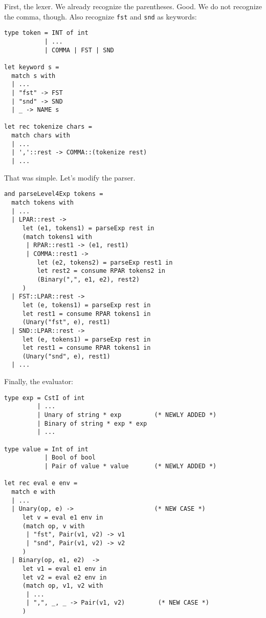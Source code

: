 \documentclass[addpoints]{exam}
\begin{document}
\begin{questions}
  \begin{solution}
    First, the lexer.
    We already recognize the parentheses. Good.
    We do not recognize the comma, though.
    Also recognize \texttt{fst} and \texttt{snd} as keywords:

    \begin{verbatim}
type token = INT of int
           | ...
           | COMMA | FST | SND

let keyword s =
  match s with
  | ...
  | "fst" -> FST
  | "snd" -> SND
  | _ -> NAME s
  
let rec tokenize chars =
  match chars with
  | ...
  | ','::rest -> COMMA::(tokenize rest)
  | ...
    \end{verbatim}

    That was simple.
    Let's modify the parser.

    \begin{verbatim}
and parseLevel4Exp tokens =
  match tokens with
  | ...
  | LPAR::rest ->
     let (e1, tokens1) = parseExp rest in
     (match tokens1 with
      | RPAR::rest1 -> (e1, rest1)
      | COMMA::rest1 ->
         let (e2, tokens2) = parseExp rest1 in
         let rest2 = consume RPAR tokens2 in
         (Binary(",", e1, e2), rest2)
     )
  | FST::LPAR::rest ->
     let (e, tokens1) = parseExp rest in
     let rest1 = consume RPAR tokens1 in
     (Unary("fst", e), rest1)     
  | SND::LPAR::rest ->
     let (e, tokens1) = parseExp rest in
     let rest1 = consume RPAR tokens1 in
     (Unary("snd", e), rest1)     
  | ...
    \end{verbatim}

    Finally, the evaluator:

    \begin{verbatim}
type exp = CstI of int
         | ...
         | Unary of string * exp         (* NEWLY ADDED *)
         | Binary of string * exp * exp
         | ...

type value = Int of int
           | Bool of bool
           | Pair of value * value       (* NEWLY ADDED *)

let rec eval e env =
  match e with
  | ...
  | Unary(op, e) ->                      (* NEW CASE *)
     let v = eval e1 env in
     (match op, v with
      | "fst", Pair(v1, v2) -> v1
      | "snd", Pair(v1, v2) -> v2
     )
  | Binary(op, e1, e2)  ->
     let v1 = eval e1 env in
     let v2 = eval e2 env in
     (match op, v1, v2 with
      | ...
      | ",", _, _ -> Pair(v1, v2)         (* NEW CASE *)
     )
    \end{verbatim}


\end{solution}
\end{questions}
\end{document}
